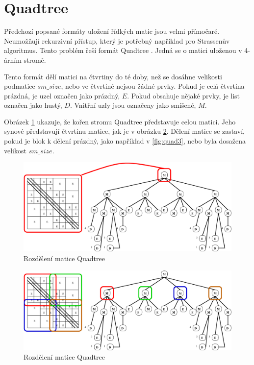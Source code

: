 \section{Quadtree}

Předchozí popsané formáty uložení řídkých matic jsou velmi přímočaré. Neumožňují rekurzivní přístup, který je potřebný například pro Strassenův algoritmus. Tento problém řeší formát Quadtree \cite{JA_SNA_08_QUAD}\cite{qdtsf}. Jedná se o matici uloženou v 4-árním stromě.

Tento formát dělí matici na čtvrtiny do té doby, než se dosáhne velikosti podmatice $sm\_size$, nebo ve čtvrtině nejsou žádné prvky. Pokud je celá čtvrtina prázdná, je uzel označen jako prázdný, $E$. Pokud obsahuje nějaké prvky, je list označen jako hustý, $D$. Vnitřní uzly jsou označeny jako smíšené, $M$.

Obrázek \ref{fig:quad1} ukazuje, že kořen stromu Quadtree představuje celou matici. Jeho synové představují čtvrtinu matice, jak je v obrázku \ref{fig:quad2}. Dělení matice se zastaví, pokud je blok k dělení prázdný, jako například v \ref{fig:quad3}, nebo byla dosažena velikost $sm\_size$.

\begin{figure}[htb]\centering
	\includegraphics[width=\textwidth]{./images/quadtree_sourceforge/quad2a.eps}
	\caption{Rozdělení matice Quadtree \cite{quadsime}}
	\label{fig:quad1}
\end{figure}

\begin{figure}[htb]\centering
	\includegraphics[width=\textwidth]{./images/quadtree_sourceforge/quad2b.eps}
	\caption{Rozdělení matice Quadtree \cite{quadsime}}
	\label{fig:quad2}
\end{figure}

